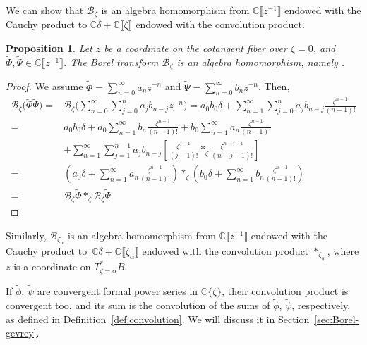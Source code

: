 \documentclass[10pt,a4paper]{amsart}
\newcommand{\C}{\mathbb{C}}
\newcommand{\series}[1]{\tilde{#1}}
\newcommand{\borel}{\mathcal{B}}
\numberwithin{equation}{section}
\newtheorem{Proposition}[Theorem]{Proposition}
 { \theoremstyle{definition}
\newtheorem{Definition}[Theorem]{Definition}
\newtheorem{Remark}[Theorem]{Remark}
\newtheorem*{notation*}{Notation}
}
\begin{document}
We can show that $\borel_\zeta$ is an algebra homomorphism from $\C\big\llbracket z^{-1}\big\rrbracket$ endowed with the Cauchy product to $\C\delta+\C\llbracket\zeta\rrbracket$ endowed with the convolution product.
\begin{Proposition}
Let $z$ be a coordinate on the cotangent fiber over $\zeta=0$, and $\series{\Phi},\series{\Psi}\in\C\big\llbracket z^{-1}\big\rrbracket$. The Borel transform $\borel_\zeta$ is an algebra homomorphism, namely
\smash{$\borel_\zeta\bigl(\series{\Phi}\series{\Psi}\bigr)=\borel_\zeta\series{\Phi} \ast_\zeta \borel_\zeta\series{\Psi}$}.
\end{Proposition}
\begin{proof}
 We assume $\series{\Phi}=\sum_{n=0}^\infty a_nz^{-n}$ and $\series{\Psi}=\sum_{n=0}^\infty b_nz^{-n}$. Then,
 \begin{align*}
\borel_\zeta\bigl(\series{\Phi}\series{\Psi}\bigr)={}&\borel_\zeta\Bigg(\sum_{n=0}^\infty\sum_{j=0}^na_jb_{n-j}z^{-n}\Bigg)=a_0b_0\delta +\sum_{n=1}^\infty\sum_{j=0}^na_jb_{n-j}\frac{\zeta^{n-1}}{(n-1)!}\\
={}&a_0b_0\delta+a_0\sum_{n=1}^\infty b_{n}\frac{\zeta^{n-1}}{(n-1)!}+b_0\sum_{n=1}^\infty a_n\frac{\zeta^{n-1}}{(n-1)!} \\
& + \sum_{n=1}^\infty\sum_{j=1}^{n-1}a_jb_{n-j}\left[\frac{\zeta^{j-1}}{(j-1)!} \ast_\zeta \frac{\zeta^{n-j-1}}{(n-j-1)!}\right]\\
={}&\left(a_0\delta+\sum_{n=1}^\infty a_n\frac{\zeta^{n-1}}{(n-1)!}\right)\ast_\zeta\left(b_0\delta+\sum_{n=1}^\infty b_n\frac{\zeta^{n-1}}{(n-1)!}\right)\\
={}&\borel_\zeta\series{\Phi} \ast_\zeta \borel_\zeta\series{\Psi}.\tag*{\qed}
\end{align*}\renewcommand{\qed}{}
\end{proof}

Similarly, $\borel_{\zeta_\alpha}$ is an algebra homomorphism from $\C\big\llbracket z^{-1}\big\rrbracket$ endowed with the Cauchy product to~${\C\delta+\C\llbracket\zeta_\alpha\rrbracket}$ endowed with the convolution product $\ast_{\zeta_\alpha}$, where $z$ is a coordinate on $T^*_{\zeta=\alpha}B$.

\begin{Remark}
If $\series{\phi}$, $\series{\psi}$ are convergent formal power series in $\C\{\zeta\}$, their convolution product is convergent too, and its sum is the convolution of the sums of $\series{\phi}$, $\series{\psi}$, respectively, as defined in Definition~\ref{def:convolution}. We will discuss it in Section~\ref{sec:Borel-gevrey}.
\end{Remark}
\end{document}
